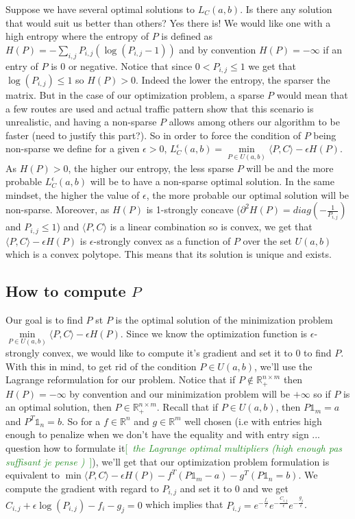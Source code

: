 \documentclass[a4paper]{article}
\theoremstyle{definition}
\theoremstyle{remark}
\newcommand{\R}{\mathbb{R}}
\newcommand{\com}[1]{\textcolor{ForestGreen}{[~\emph{#1}~]}}
\begin{document}
Suppose we have several optimal solutions to $L_C(a,b)$. Is there any solution that would suit us better than others? Yes there is! We would like one with a high entropy where the entropy of $P$ is defined as $H(P)=-\sum\limits_{i,j}P_{i,j}(\log(P_{i,j}-1))$ and by convention $H(P)=-\infty$ if an entry of $P$ is 0 or negative. Notice that since $0<P_{i,j}\leq 1$ we get that $\log(P_{i,j})\leq 1$ so $H(P)>0$. Indeed the lower the entropy, the sparser the matrix. But in the case of our optimization problem, a sparse $P$ would mean that a few routes are used and actual traffic pattern show that this scenario is unrealistic, and having a non-sparse $P$ allows among others our algorithm to be faster (need to justify this part?). So in order to force the condition of $P$ being non-sparse we define for a given $\epsilon>0$, $L_C^{\epsilon}(a,b)=\min\limits_{P\in U(a,b)}\langle P,C \rangle-\epsilon H(P)$. As $H(P)>0$, the higher our entropy, the less sparse $P$ will be and the more probable $L_C^{\epsilon}(a,b)$ will be to have a non-sparse optimal solution. In the same mindset, the higher the value of $\epsilon$, the more probable our optimal solution will be non-sparse. Moreover, as $H(P)$ is 1-strongly concave ($\partial ^2H(P)=diag(-\frac{1}{P_{i,j}})$ and $P_{i,j}\leq 1$) and $\langle P,C \rangle$ is a linear combination so is convex, we get that $\langle P,C \rangle-\epsilon H(P)$ is $\epsilon$-strongly convex as a function of $P$ over the set $U(a,b)$ which is a convex polytope. This means that its solution is unique and exists. 

\subsection*{How to compute $P$}

Our goal is to find $P$ st $P$ is the optimal solution of the minimization problem $\min\limits_{P\in U(a,b)}\langle P,C \rangle-\epsilon H(P)$. Since we know the optimization function is $\epsilon$-strongly convex, we would like to compute it's gradient and set it to 0 to find $P$. With this in mind, to get rid of the condition $P\in U(a,b)$, we'll use the Lagrange reformulation for our problem. Notice that if $P\notin \R^{n\times m}_+$ then $H(P)=-\infty$ by convention and our minimization problem will be $+\infty$ so if $P$ is an optimal solution, then $P\in \R^{n\times m}_+$. Recall that if $P\in U(a,b)$, then $P\mathbb{1}_m=a$ and $P^T\mathbb{1}_n=b$.  So for a $f\in \R^n$ and $g\in \R^m$ well chosen (i.e with entries high enough to penalize when we don't have the equality and with entry sign ... question how to formulate it\com{the Lagrange optimal multipliers (high enough pas suffisant je pense )}), we'll get that our optimization problem formulation is equivalent to $\min \langle P,C \rangle-\epsilon H(P)-f^T(P\mathbb{1}_m-a)-g^T(P\mathbb{1}_n=b)$. We compute the gradient with regard to $P_{i,j}$ and set it to 0 and we get $C_{i,j}+\epsilon \log(P_{i,j})-f_i-g_j=0$ which implies that $P_{i,j}=e^{-\frac{f_i}{\epsilon}}e^{-\frac{C_{i,j}}{\epsilon}}e^{-\frac{g_j}{\epsilon}}$. 
\end{document}
